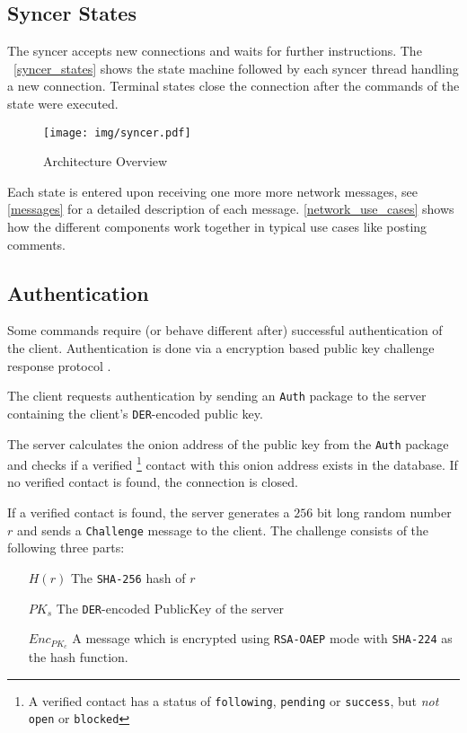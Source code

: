 \documentclass[12pt]{article}
\begin{document}
\subsection{Syncer States}

The syncer accepts new connections and waits for further instructions. The ~\autoref{syncer_states} shows the state machine followed by each syncer thread handling a new connection. Terminal states close the connection after the commands of the state were executed.

\begin{figure}[h]
  \centering
    \texttt{[image: img/syncer.pdf]}
  \caption{Architecture Overview} \label{syncer_states}
\end{figure}

Each state is entered upon receiving one more more network messages, see \ref{messages} for a detailed description of each message.
\autoref{network_use_cases} shows how the different components work together in typical use cases like posting comments.

\subsection{Authentication}

\label{authentication}

Some commands require (or behave different after) successful authentication of the client.
Authentication is done via a encryption based public key challenge response protocol \cite{Menezes:1996:HAC:548089:chap10}.

The client requests authentication by sending an \texttt{Auth} package to the server containing the client's \texttt{DER}-encoded public key.

The server calculates the onion address of the public key from the \texttt{Auth} package and checks if a verified \footnote{A verified contact has a status of \texttt{following}, \texttt{pending} or \texttt{success}, but \textit{not} \texttt{open} or \texttt{blocked}} contact with this onion address exists in the database. If no verified contact is found, the connection is closed.

If a verified contact is found, the server generates a $256$ bit long random number $r$ and sends a \texttt{Challenge} message to the client. The challenge consists of the following three parts:

\begin{enumerate}
\item[$H(r)$] The \texttt{SHA-256} hash of $r$
\item[$PK_s$] The \texttt{DER}-encoded PublicKey of the server
\item[$Enc_{PK_c}$] A message which is encrypted using \texttt{RSA-OAEP} mode with \texttt{SHA-224} as the hash function.
\end{enumerate}
\end{document}
